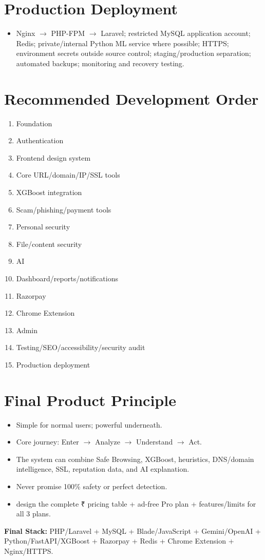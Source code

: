 \documentclass[11pt,a4paper]{article}
\begin{document}
\section{Production Deployment}
\begin{itemize}[noitemsep]
    \item Nginx $\rightarrow$ PHP-FPM $\rightarrow$ Laravel; restricted MySQL application account; Redis; private/internal Python ML service where possible; HTTPS; environment secrets outside source control; staging/production separation; automated backups; monitoring and recovery testing.
\end{itemize}

\section{Recommended Development Order}
\begin{enumerate}[noitemsep]
    \item Foundation
    \item Authentication
    \item Frontend design system
    \item Core URL/domain/IP/SSL tools
    \item XGBoost integration
    \item Scam/phishing/payment tools
    \item Personal security
    \item File/content security
    \item AI
    \item Dashboard/reports/notifications
    \item Razorpay
    \item Chrome Extension
    \item Admin
    \item Testing/SEO/accessibility/security audit
    \item Production deployment
\end{enumerate}

\section{Final Product Principle}
\begin{itemize}[noitemsep]
    \item Simple for normal users; powerful underneath.
    \item Core journey: Enter $\rightarrow$ Analyze $\rightarrow$ Understand $\rightarrow$ Act.
    \item The system can combine Safe Browsing, XGBoost, heuristics, DNS/domain intelligence, SSL, reputation data, and AI explanation.
    \item Never promise 100\% safety or perfect detection.
    \item design the complete ₹ pricing table + ad-free Pro plan + features/limits for all 3 plans.
\end{itemize}

\vspace{1em}
\noindent\textbf{Final Stack:} PHP/Laravel + MySQL + Blade/JavaScript + Gemini/OpenAI + Python/FastAPI/XGBoost + Razorpay + Redis + Chrome Extension + Nginx/HTTPS.
\end{document}
